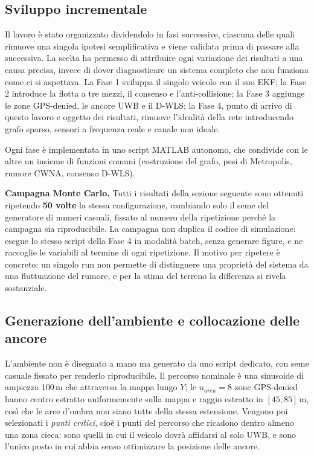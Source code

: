 \documentclass[conference,9pt]{IEEEtran}
\begin{document}
\subsection{Sviluppo incrementale}

Il lavoro \`e stato organizzato dividendolo in fasi successive, ciascuna delle
quali rimuove una singola ipotesi semplificativa e viene validata prima di
passare alla successiva. La scelta ha permesso di attribuire ogni variazione
dei risultati a una causa precisa, invece di dover diagnosticare un sistema
completo che non funziona come ci si aspettava. La Fase 1 sviluppa il singolo
veicolo con il suo EKF; la Fase 2 introduce la flotta a tre mezzi, il consenso e
l'anti-collisione; la Fase 3 aggiunge le zone GPS-denied, le ancore UWB e il
D-WLS; la Fase 4, punto di arrivo di questo lavoro e oggetto dei risultati,
rimuove l'idealit\`a della rete introducendo grafo sparso, sensori a frequenza
reale e canale non ideale.

Ogni fase \`e implementata in uno script MATLAB autonomo, che condivide con le
altre un insieme di funzioni comuni (costruzione del grafo, pesi di Metropolis,
rumore CWNA, consenso D-WLS).

\textbf{Campagna Monte Carlo.} Tutti i risultati della sezione seguente sono
ottenuti ripetendo \textbf{50 volte} la stessa configurazione, cambiando solo il
seme del generatore di numeri casuali, fissato al numero della ripetizione
perch\'e la campagna sia riproducibile. La campagna non duplica il codice di
simulazione: esegue lo stesso script della Fase 4 in modalit\`a batch, senza
generare figure, e ne raccoglie le variabili al termine di ogni ripetizione. Il
motivo per ripetere \`e concreto: un singolo run non permette di distinguere una
propriet\`a del sistema da una fluttuazione del rumore, e per la stima del
terreno la differenza si rivela sostanziale.

\subsection{Generazione dell'ambiente e collocazione delle ancore}
\label{sub:ambiente}

L'ambiente non \`e disegnato a mano ma generato da uno script dedicato, con
seme casuale fissato per renderlo riproducibile. Il percorso nominale \`e una
sinusoide di ampiezza 100\,m che attraversa la mappa lungo $Y$; le
$n_{area} = 8$ zone GPS-denied hanno centro estratto uniformemente sulla mappa
e raggio estratto in $[45, 85]$\,m, cos\`i che le aree d'ombra non siano tutte
della stessa estensione. Vengono poi selezionati i \emph{punti critici}, cio\`e
i punti del percorso che ricadono dentro almeno una zona cieca: sono quelli in
cui il veicolo dovr\`a affidarsi al solo UWB, e sono l'unico posto in cui abbia
senso ottimizzare la posizione delle ancore.
\end{document}
